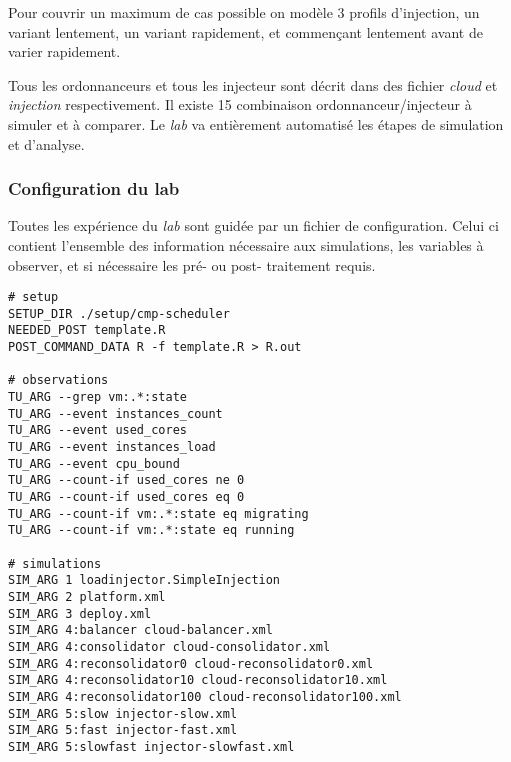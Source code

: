 \documentclass[parallelisme]{compas2017}
\begin{document}
Pour couvrir un maximum de cas possible on modèle 3 profils d'injection, un
variant lentement, un variant rapidement, et commençant lentement avant de
varier rapidement.

Tous les ordonnanceurs et tous les injecteur sont décrit dans des fichier
\emph{cloud} et \emph{injection} respectivement. Il existe 15 combinaison
ordonnanceur/injecteur à simuler et à comparer. Le \emph{lab} va entièrement
automatisé les étapes de simulation et d'analyse.

\subsubsection{Configuration du lab}

Toutes les expérience du \emph{lab} sont guidée par un fichier de configuration.
Celui ci contient l'ensemble des information nécessaire aux simulations, les
variables à observer, et si nécessaire les pré- ou post- traitement requis. 

\begin{verbatim}
# setup
SETUP_DIR ./setup/cmp-scheduler
NEEDED_POST template.R
POST_COMMAND_DATA R -f template.R > R.out

# observations
TU_ARG --grep vm:.*:state
TU_ARG --event instances_count 
TU_ARG --event used_cores
TU_ARG --event instances_load 
TU_ARG --event cpu_bound
TU_ARG --count-if used_cores ne 0
TU_ARG --count-if used_cores eq 0
TU_ARG --count-if vm:.*:state eq migrating
TU_ARG --count-if vm:.*:state eq running

# simulations
SIM_ARG 1 loadinjector.SimpleInjection
SIM_ARG 2 platform.xml 
SIM_ARG 3 deploy.xml
SIM_ARG 4:balancer cloud-balancer.xml
SIM_ARG 4:consolidator cloud-consolidator.xml
SIM_ARG 4:reconsolidator0 cloud-reconsolidator0.xml
SIM_ARG 4:reconsolidator10 cloud-reconsolidator10.xml 
SIM_ARG 4:reconsolidator100 cloud-reconsolidator100.xml
SIM_ARG 5:slow injector-slow.xml
SIM_ARG 5:fast injector-fast.xml
SIM_ARG 5:slowfast injector-slowfast.xml 
\end{verbatim}
\end{document}
